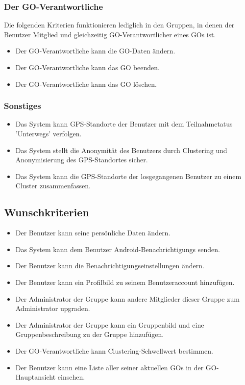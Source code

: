 \documentclass[parskip=full]{scrartcl}
\begin{document}
\subsubsection*{Der GO-Verantwortliche}
	Die folgenden Kriterien funktionieren lediglich in den Gruppen, in denen der Benutzer Mitglied und gleichzeitig \gls{GO-Verantwortlicher} eines GOs ist.
	\begin{itemize}
		\item Der GO-Verantwortliche kann die GO-Daten ändern.
		\item Der GO-Verantwortliche kann das GO beenden.
		\item Der GO-Verantwortliche kann das GO löschen.
	\end{itemize}
	
\subsubsection*{Sonstiges}
	\begin{itemize}
		\item Das System kann GPS-Standorte der Benutzer mit dem Teilnahmetatus 'Unterwegs' verfolgen.
		\item Das System stellt die Anonymität des Benutzers durch \gls{Clustering} und Anonymisierung des GPS-Standortes sicher.
		\item Das System kann die GPS-Standorte der losgegangenen Benutzer zu einem Cluster zusammenfassen.
	\end{itemize}

	
\subsection{Wunschkriterien}
\begin{itemize}
	\item Der Benutzer kann seine persönliche Daten ändern.
	\item Das System kann dem Benutzer \glspl{Android-Benachrichtigung} senden.
	\item Der Benutzer kann die Benachrichtigungseinstellungen ändern.
	\item Der Benutzer kann ein Profilbild zu seinem Benutzeraccount hinzufügen. %
	\item Der Administrator der Gruppe kann andere Mitglieder dieser Gruppe zum Administrator upgraden.
	\item Der Administrator der Gruppe kann ein Gruppenbild und eine Gruppenbeschreibung zu der Gruppe hinzufügen.
	\item Der GO-Verantwortliche kann Clustering-Schwellwert bestimmen.
	\item Der Benutzer kann eine Liste aller seiner aktuellen GOs in der GO-Hauptansicht einsehen.
\end{itemize}
\end{document}
